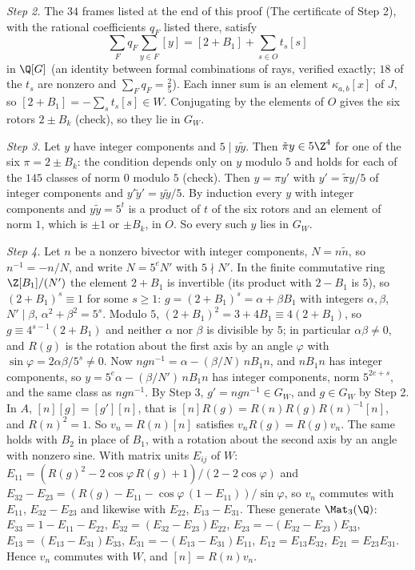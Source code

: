 \emph{Step 2.} The $34$ frames listed at the end of this proof (The certificate of Step 2), with the rational coefficients $q_{F}$ listed there, satisfy
\[
\sum_{F}q_{F}\sum_{y \in F}[y] = [2 + B_{1}] + \sum_{s \in O}t_{s}[s]
\]
in $\Q[G]$ (an identity between formal combinations of rays, verified exactly; $18$ of the $t_{s}$ are nonzero and $\sum_{F}q_{F} = \tfrac25$). Each inner sum is an element $\kappa_{a,b}[x]$ of $J$, so $[2 + B_{1}] = -\sum_{s}t_{s}[s] \in W$. Conjugating by the elements of $O$ gives the six rotors $2 \pm B_{k}$ (check), so they lie in $G_{W}$.

\emph{Step 3.} Let $y$ have integer components and $5 \mid y\tilde{y}$. Then $\tilde{\pi}y \in 5\Z^{4}$ for one of the six $\pi = 2 \pm B_{k}$: the condition depends only on $y$ modulo $5$ and holds for each of the $145$ classes of norm $0$ modulo $5$ (check). Then $y = \pi y'$ with $y' = \tilde{\pi}y/5$ of integer components and $y'\tilde{y}' = y\tilde{y}/5$. By induction every $y$ with integer components and $y\tilde{y} = 5^{t}$ is a product of $t$ of the six rotors and an element of norm $1$, which is $\pm 1$ or $\pm B_{k}$, in $O$. So every such $y$ lies in $G_{W}$.

\emph{Step 4.} Let $n$ be a nonzero bivector with integer components, $N = n\tilde{n}$, so $n^{-1} = -n/N$, and write $N = 5^{e}N'$ with $5 \nmid N'$. In the finite commutative ring $\Z[B_{1}]/(N')$ the element $2 + B_{1}$ is invertible (its product with $2 - B_{1}$ is $5$), so $(2 + B_{1})^{s} \equiv 1$ for some $s \ge 1$: $g = (2 + B_{1})^{s} = \alpha + \beta B_{1}$ with integers $\alpha, \beta$, $N' \mid \beta$, $\alpha^{2} + \beta^{2} = 5^{s}$. Modulo $5$, $(2 + B_{1})^{2} = 3 + 4B_{1} \equiv 4(2 + B_{1})$, so $g \equiv 4^{s-1}(2 + B_{1})$ and neither $\alpha$ nor $\beta$ is divisible by $5$; in particular $\alpha\beta \ne 0$, and $R(g)$ is the rotation about the first axis by an angle $\varphi$ with $\sin\varphi = 2\alpha\beta/5^{s} \ne 0$. Now $ngn^{-1} = \alpha - (\beta/N)\,nB_{1}n$, and $nB_{1}n$ has integer components, so $y = 5^{e}\alpha - (\beta/N')\,nB_{1}n$ has integer components, norm $5^{2e+s}$, and the same class as $ngn^{-1}$. By Step 3, $g' = ngn^{-1} \in G_{W}$, and $g \in G_{W}$ by Step 2. In $A$, $[n][g] = [g'][n]$, that is $[n]R(g) = R(n)R(g)R(n)^{-1}[n]$, and $R(n)^{2} = 1$. So $v_{n} = R(n)[n]$ satisfies $v_{n}R(g) = R(g)v_{n}$. The same holds with $B_{2}$ in place of $B_{1}$, with a rotation about the second axis by an angle with nonzero sine. With matrix units $E_{ij}$ of $W$: $E_{11} = (R(g)^{2} - 2\cos\varphi\,R(g) + 1)/(2 - 2\cos\varphi)$ and $E_{32} - E_{23} = (R(g) - E_{11} - \cos\varphi\,(1 - E_{11}))/\sin\varphi$, so $v_{n}$ commutes with $E_{11}$, $E_{32} - E_{23}$ and likewise with $E_{22}$, $E_{13} - E_{31}$. These generate $\Mat_{3}(\Q)$: $E_{33} = 1 - E_{11} - E_{22}$, $E_{32} = (E_{32} - E_{23})E_{22}$, $E_{23} = -(E_{32} - E_{23})E_{33}$, $E_{13} = (E_{13} - E_{31})E_{33}$, $E_{31} = -(E_{13} - E_{31})E_{11}$, $E_{12} = E_{13}E_{32}$, $E_{21} = E_{23}E_{31}$. Hence $v_{n}$ commutes with $W$, and $[n] = R(n)v_{n}$.

